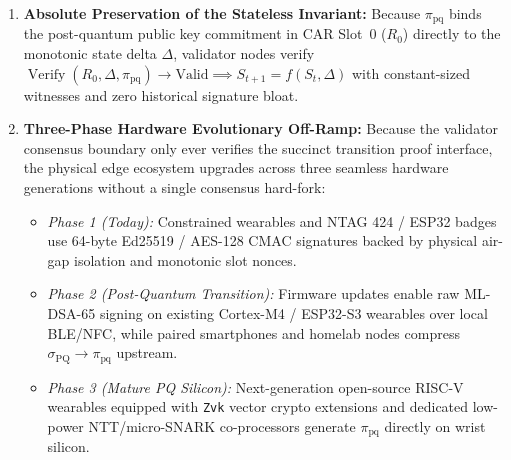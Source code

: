 \documentclass[a4paper,11pt,twoside,parskip=half-,headings=small]{scrartcl}
\newcommand{\code}[1]{\texttt{#1}}
\begin{document}
\begin{enumerate}[nosep]
  \item \textbf{Absolute Preservation of the Stateless Invariant:}
  Because $\pi_{\text{pq}}$ binds the post-quantum public key commitment in CAR Slot~0 ($R_0$) directly to the monotonic state delta $\Delta$, validator nodes verify $\operatorname{Verify}(R_0, \Delta, \pi_{\text{pq}}) \to \text{Valid} \implies S_{t+1} = f(S_t, \Delta)$ with constant-sized witnesses and zero historical signature bloat.

  \item \textbf{Three-Phase Hardware Evolutionary Off-Ramp:}
  Because the validator consensus boundary only ever verifies the succinct transition proof interface, the physical edge ecosystem upgrades across three seamless hardware generations without a single consensus hard-fork:
  \begin{itemize}[nosep]
    \item \emph{Phase 1 (Today):} Constrained wearables and NTAG 424 / ESP32 badges use 64-byte Ed25519 / AES-128 CMAC signatures backed by physical air-gap isolation and monotonic slot nonces.
    \item \emph{Phase 2 (Post-Quantum Transition):} Firmware updates enable raw ML-DSA-65 signing on existing Cortex-M4 / ESP32-S3 wearables over local BLE/NFC, while paired smartphones and homelab nodes compress $\sigma_{\text{PQ}} \to \pi_{\text{pq}}$ upstream.
    \item \emph{Phase 3 (Mature PQ Silicon):} Next-generation open-source RISC-V wearables equipped with \code{Zvk} vector crypto extensions and dedicated low-power NTT/micro-SNARK co-processors generate $\pi_{\text{pq}}$ directly on wrist silicon.
  \end{itemize}
\end{enumerate}
\end{document}
